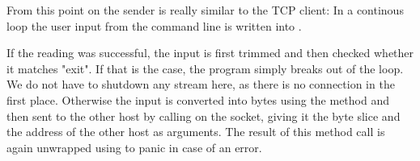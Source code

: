 From this point on the sender is really similar to the TCP client: In a continous loop the user input from the command
line is written into .

If the reading was successful, the input is first trimmed and then checked whether it
matches "exit". If that is the case, the program simply breaks out of the loop. We do not have to shutdown any stream
here, as there is no connection in the first place. Otherwise the input is converted into bytes using the method
 and then sent to the other host by calling  on the socket, giving it the byte slice and
the address of the other host as arguments. The result of this method call is again unwrapped using  to
panic in case of an error.
